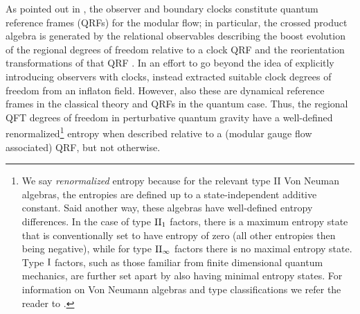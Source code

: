 \documentclass[]{jkpaper}
\theoremstyle{plain}
\theoremstyle{definition}
\begin{document}
As pointed out in \cite{DeVuyst:2024pop,DVEHK,Fewster:2024pur,AliAhmad:2024wja}, the observer and boundary clocks constitute quantum reference frames (QRFs) for the modular flow; in particular, the crossed product algebra is generated by the relational observables describing the boost evolution of the regional degrees of freedom relative to a clock QRF and the reorientation transformations of that QRF \cite{DeVuyst:2024pop,DVEHK}. In an effort to go beyond the idea of explicitly introducing observers with clocks, \cite{Chen:2024rpx,Kudler-Flam:2024psh} instead extracted suitable clock degrees of freedom from an inflaton field. However, also these are  dynamical reference frames in the classical theory \cite{Goeller:2022rsx,Carrozza:2022xut} and QRFs in the quantum case. Thus, the regional QFT degrees of freedom in perturbative quantum gravity have a well-defined renormalized\footnote{\label{footnote: renormalized entropy}We say \textit{renormalized} entropy because for the relevant type II Von Neuman algebras, the entropies are defined up to a state-independent additive constant.  Said another way, these algebras have well-defined entropy differences.  In the case of type $\rm{II}_1$ factors, there is a maximum entropy state that is conventionally set to have entropy of zero (all other entropies then being negative), while for type $\rm{II}_\infty$ factors there is no maximal entropy state.  Type $\rm{I}$ factors, such as those familiar from finite dimensional quantum mechanics, are further set apart by also having minimal entropy states.  For information on Von Neumann algebras and type classifications we refer the reader to \cite{WittenRevModPhys.90.045003,Sorce:2023fdx,Takesaki1979,Witten:2021unn}.} entropy when described relative to a (modular gauge flow associated) QRF, but not otherwise.
\end{document}
